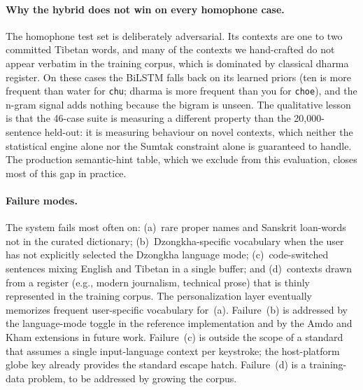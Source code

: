 \documentclass[11pt]{article}
\begin{document}
\paragraph{Why the hybrid does not win on every homophone case.} The homophone test set is deliberately adversarial. Its contexts are one to two committed Tibetan words, and many of the contexts we hand-crafted do not appear verbatim in the training corpus, which is dominated by classical dharma register. On these cases the BiLSTM falls back on its learned priors (ten is more frequent than water for \texttt{chu}; dharma is more frequent than you for \texttt{choe}), and the n-gram signal adds nothing because the bigram is unseen. The qualitative lesson is that the 46-case suite is measuring a different property than the 20{,}000-sentence held-out: it is measuring behaviour on novel contexts, which neither the statistical engine alone nor the Sumtak constraint alone is guaranteed to handle. The production semantic-hint table, which we exclude from this evaluation, closes most of this gap in practice.

\paragraph{Failure modes.} The system fails most often on: (a)~rare proper names and Sanskrit loan-words not in the curated dictionary; (b)~Dzongkha-specific vocabulary when the user has not explicitly selected the Dzongkha language mode; (c)~code-switched sentences mixing English and Tibetan in a single buffer; and (d)~contexts drawn from a register (e.g., modern journalism, technical prose) that is thinly represented in the training corpus. The personalization layer eventually memorizes frequent user-specific vocabulary for~(a). Failure~(b) is addressed by the language-mode toggle in the reference implementation and by the Amdo and Kham extensions in future work. Failure~(c) is outside the scope of a standard that assumes a single input-language context per keystroke; the host-platform globe key already provides the standard escape hatch. Failure~(d) is a training-data problem, to be addressed by growing the corpus.
\end{document}
